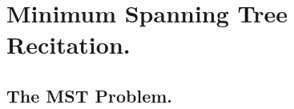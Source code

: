   



%
%





\ifdefined\BOOK
\else
\setcounter{chapter}{10}
\fi
\chapter{Minimum Spanning Tree Recitation.} 


\section{The MST Problem.}

